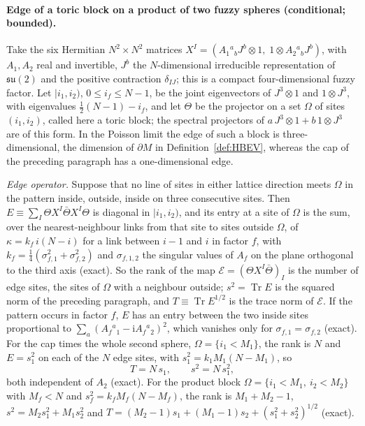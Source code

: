 \paragraph{Edge of a toric block on a product of two fuzzy spheres (conditional; bounded).}
Take the six Hermitian \(N^2\times N^2\) matrices \(X^I=(A_1{}^a{}_bJ^b\otimes1,\;1\otimes A_2{}^a{}_bJ^b)\), with \(A_1,A_2\) real and invertible, \(J^b\) the \(N\)-dimensional irreducible representation of \(\mathfrak{su}(2)\) and the positive contraction \(\delta_{IJ}\); this is a compact four-dimensional fuzzy factor. Let \(|i_1,i_2)\), \(0\le i_f\le N-1\), be the joint eigenvectors of \(J^3\otimes1\) and \(1\otimes J^3\), with eigenvalues \(\tfrac12(N-1)-i_f\), and let \(\Theta\) be the projector on a set \(\Omega\) of sites \((i_1,i_2)\), called here a toric block; the spectral projectors of \(a\,J^3\otimes1+b\,1\otimes J^3\) are of this form. In the Poisson limit the edge of such a block is three-dimensional, the dimension of \(\partial M\) in Definition~\ref{def:HBEV}, whereas the cap of the preceding paragraph has a one-dimensional edge.

\emph{Edge operator.} Suppose that no line of sites in either lattice direction meets \(\Omega\) in the pattern inside, outside, inside on three consecutive sites. Then \(E\equiv\sum_I\Theta X^I\bar\Theta X^I\Theta\) is diagonal in \(|i_1,i_2)\), and its entry at a site of \(\Omega\) is the sum, over the nearest-neighbour links from that site to sites outside \(\Omega\), of \(\kappa=k_f\,i(N-i)\) for a link between \(i-1\) and \(i\) in factor \(f\), with \(k_f=\tfrac14(\sigma_{f,1}^2+\sigma_{f,2}^2)\) and \(\sigma_{f,1,2}\) the singular values of \(A_f\) on the plane orthogonal to the third axis (exact). So the rank of the map \(\mathcal E=(\Theta X^I\bar\Theta)_I\) is the number of edge sites, the sites of \(\Omega\) with a neighbour outside; \(s^2=\operatorname{Tr}E\) is the squared norm of the preceding paragraph, and \(T\equiv\operatorname{Tr}E^{1/2}\) is the trace norm of \(\mathcal E\). If the pattern occurs in factor \(f\), \(E\) has an entry between the two inside sites proportional to \(\sum_a(A_f{}^a{}_1-\mathrm iA_f{}^a{}_2)^2\), which vanishes only for \(\sigma_{f,1}=\sigma_{f,2}\) (exact). For the cap times the whole second sphere, \(\Omega=\{i_1<M_1\}\), the rank is \(N\) and \(E=s_1^2\) on each of the \(N\) edge sites, with \(s_1^2=k_1M_1(N-M_1)\), so
\[
T=N\,s_1,\qquad s^2=N\,s_1^2,
\]
both independent of \(A_2\) (exact). For the product block \(\Omega=\{i_1<M_1,\ i_2<M_2\}\) with \(M_f<N\) and \(s_f^2=k_fM_f(N-M_f)\), the rank is \(M_1+M_2-1\), \(s^2=M_2s_1^2+M_1s_2^2\) and \(T=(M_2-1)s_1+(M_1-1)s_2+(s_1^2+s_2^2)^{1/2}\) (exact).

